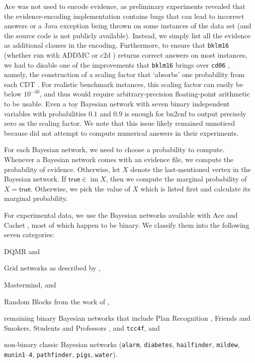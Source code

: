 \documentclass[accepted]{uai2021}
\theoremstyle{definition}
\DeclareMathOperator{\im}{im}
\begin{document}
\textsf{Ace} was not used to encode evidence, as preliminary experiments
revealed that the evidence-encoding implementation contains bugs that can lead
to incorrect answers or a Java exception being thrown on some instances of the
data set (and the source code is not publicly available). Instead, we simply
list all the evidence as additional clauses in the encoding. Furthermore, to
ensure that \texttt{bklm16} \citep{DBLP:conf/ecai/BartKLM16} (whether run with
\textsf{ADDMC} \citep{DBLP:conf/aaai/DudekPV20} or \textsf{c2d}
\citep{DBLP:conf/ecai/Darwiche04}) returns correct answers on most instances, we
had to disable one of the improvements that \texttt{bklm16} brings over
\texttt{cd06} \citep{DBLP:conf/sat/ChaviraD06}, namely, the construction of a
scaling factor that `absorbs' one probability from each CDT
\citep{DBLP:conf/ecai/BartKLM16}. For realistic benchmark instances, this
scaling factor can easily be below $10^{-30}$, and thus would require
arbitrary-precision floating-point arithmetic to be usable. Even a toy Bayesian
network with seven binary independent variables with probabilities $0.1$ and
$0.9$ is enough for \textsf{bn2cnf} to output precisely zero as the scaling
factor. We note that this issue likely remained unnoticed because
\citet{DBLP:conf/ecai/BartKLM16} did not attempt to compute numerical answers in
their experiments.

For each Bayesian network, we need to choose a probability to compute. Whenever
a Bayesian network comes with an evidence file, we compute the probability of
evidence. Otherwise, let $X$ denote the last-mentioned vertex in the Bayesian
network. If $\mathsf{true} \in \im X$, then we compute the marginal probability
of $X = \mathsf{true}$. Otherwise, we pick the value of $X$ which is listed
first and calculate its marginal probability.

For experimental data, we use the Bayesian networks available with \textsf{Ace}
and \textsf{Cachet} \citep{DBLP:conf/sat/SangBBKP04}, most of which happen to be
binary. We classify them into the following seven categories:
\begin{itemize*}
\item DQMR and
\item Grid networks as described by \citet{DBLP:conf/aaai/SangBK05},
\item Mastermind, and
\item Random Blocks from the work of \citet{DBLP:journals/ijar/ChaviraDJ06},
\item remaining binary Bayesian networks that include Plan Recognition
  \citep{DBLP:conf/aaai/SangBK05}, Friends and Smokers, Students and Professors
  \citep{DBLP:journals/ijar/ChaviraDJ06}, and \texttt{tcc4f}, and
\item non-binary classic Bayesian networks (\texttt{alarm}, \texttt{diabetes},
  \texttt{hailfinder}, \texttt{mildew}, \texttt{munin1}--\texttt{4},
  \texttt{pathfinder}, \texttt{pigs}, \texttt{water}).
\end{itemize*}
\end{document}
